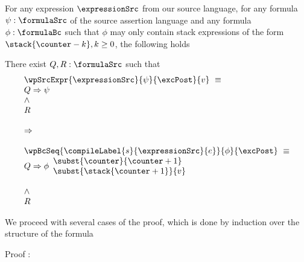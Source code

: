 \begin{exprSrcBcWp1} \label{exprValueOnStack}
 For any expression $\expressionSrc$ from our source language, for any formula $\psi: \formulaSrc$  
of the source assertion language and any formula $\phi: \formulaBc$ such that $\phi$ may only 
contain stack expressions of the form     $\stack{\counter - k}, k \ge 0$, the following holds



  There  exist $ Q, R : \formulaSrc$  such that 
$$ \begin{array}{l}
      \wpSrcExpr{\expressionSrc }{ \psi }{ \excPost}{v} \  \equiv \\ 
          Q \Rightarrow \psi \\
          \wedge \\ 
	  R  \\
  \\
\Rightarrow \\
 \\

  
	    \wpBcSeq{ \compileLabel{s}{\expressionSrc}{e} }{ \phi }{\excPost} \  \equiv \\ 
              Q \Rightarrow \phi \begin{array}{l}
                                       \subst{\counter}{\counter + 1}\\
			               \subst{\stack{\counter +1}}{ v }
                         \end{array} \\ \\
          \wedge \\ 
	  R 
  \end{array}$$




\end{exprSrcBcWp1}

We proceed with several cases of the proof, which is done by induction over the structure of the formula

Proof : 
 


